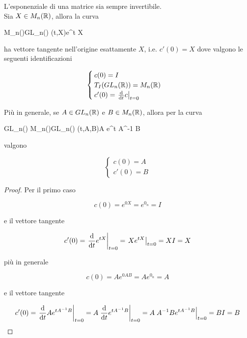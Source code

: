 \begin{corollary}
	L'esponenziale di una matrice sia sempre invertibile.\\
	Sia $ X \in M_{n}(\mathbb{R}) $, allora la curva
	
		{\R \times M_{n}(\R)}{GL_{n}(\R)}%
		{(t,X)}{e^{t X}}
	
	ha vettore tangente nell'origine esattamente $ X $, i.e. $ c'(0) = X $ dove valgono le seguenti identificazioni
	
	\begin{equation}
		\begin{cases}
			c(0) = I\\
			T_{I}(GL_{n}(\mathbb{R})) = M_{n}(\mathbb{R})\\
			c'(0) = \left. \dv{t} c \right|_{t=0}
		\end{cases}
	\end{equation}

	Più in generale, se $ A \in GL_{n}(\mathbb{R}) $ e $ B \in M_{n}(\mathbb{R}) $, allora per la curva
	
		{\R \times GL_{n}(\R) \times M_{n}(\R)}{GL_{n}(\R)}%
		{(t,A,B)}{A e^{t A^{-1} B}}
	
	valgono
	
	\begin{equation}
		\begin{cases}
			c(0) = A\\
			c'(0) = B
		\end{cases}
	\end{equation}
\end{corollary}

\begin{proof}
	Per il primo caso
	
	\begin{equation}
		c(0) = e^{0 X} = e^{0_{n}} = I
	\end{equation}

	e il vettore tangente
	
	\begin{equation}
		c'(0) = \left. \dv{t} e^{t X} \right|_{t=0} = \left. X e^{t X} \right|_{t=0} = X I = X
	\end{equation}

	più in generale
	
	\begin{equation}
		c(0) = A e^{0 A B} = A e^{0_{n}} = A
	\end{equation}

	e il vettore tangente
	
	\begin{equation}
		c'(0) = \left. \dv{t} A e^{t A^{-1} B} \right|_{t=0} = A \left. \dv{t} e^{t A^{-1} B} \right|_{t=0} = A \left. A^{-1} B e^{t A^{-1} B} \right|_{t=0} = B I = B
	\end{equation}
\end{proof}


